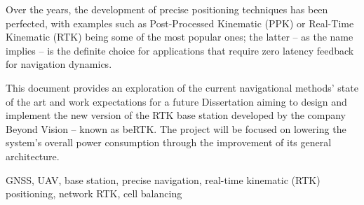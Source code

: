 Over the years, the development of precise positioning techniques has been perfected, with examples such as Post-Processed Kinematic (PPK) or Real-Time Kinematic (RTK) being some of the most popular ones; the latter -- as the name implies -- is the definite choice for applications that require zero latency feedback for navigation dynamics.

This document provides an exploration of the current navigational methods' state of the art and work expectations for a future Dissertation aiming to design and implement the new version of the RTK base station developed by the company Beyond Vision -- known as beRTK\textsuperscript{\textregistered}. The project will be focused on lowering the system's overall power consumption through the improvement of its general architecture.

\begin{keywords}
  GNSS, UAV, base station, precise navigation, real-time kinematic (RTK) positioning, network RTK, cell balancing
\end{keywords} 
